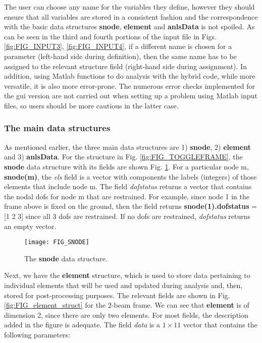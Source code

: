 \begin{appendices}
The user can choose any name for the variables they define, however they should 
ensure that all variables are stored in a consistent fashion and the 
correspondence with the basic data structures \textbf{snode}, \textbf{element} 
and \textbf{anlsData} is not spoiled. As can be seen in the third and fourth 
portions of the input file in Figs. \ref{fig:FIG_INPUT3}, \ref{fig:FIG_INPUT4}, 
if a different name is chosen for a parameter (left-hand side during 
definition), then the same name has to be assigned to the relevant structure 
field (right-hand side during assignment). In addition, using Matlab functions 
to do analysis with the hybrid code, while more versatile, it is also more 
error-prone. The numerous error checks implemented for the \acrshort{gui} 
version are not carried out when setting up a problem using Matlab input files, 
so users should be more cautious in the latter case.

\subsubsection*{The main data structures}

As mentioned earlier, the three main data structures are 1) \textbf{snode}, 2) 
\textbf{element} and 3) \textbf{anlsData}. For the structure in Fig. 
\ref{fig:FIG_TOGGLEFRAME}, the \textbf{snode} data structure with its fields 
are shown Fig. \ref{fig:FIG_SNODE}. For a particular node m, \textbf{snode(m)}, 
the \textit{els} field is a vector with components the labels (integers) of 
those elements that include node m. The field \textit{dofstatus} returns a 
vector that contains the nodal \acrshort{dof}s for node m that are restrained. 
For example, since node 1 in the frame above is fixed on the ground, then the 
field returns \textbf{snode(1).dofstatus} = [1 2 3] since all 3 \acrshort{dof}s 
are restrained. If no \acrshort{dof}s are restrained, \textit{dofstatus} 
returns an empty vector. 



\begin{figure}
	\centering
	\texttt{[image: FIG\_SNODE]}
	\caption{The \textbf{snode} data structure.}
	\label{fig:FIG_SNODE}
\end{figure}

Next, we have the \textbf{element} structure, which is used to store data 
pertaining to individual elements that will be used and updated during analysis 
and, then, stored for post-processing purposes. The relevant fields are shown 
in Fig. \ref{fig:FIG_element_struct} for the 2-beam frame. We can see that 
\textbf{element} is of 
dimension 2, since there are only two elements. For most fields, the 
description added in the figure is adequate. The field \textit{data} is a 
$1\times 11$ vector that contains the following parameters:


\end{appendices}

